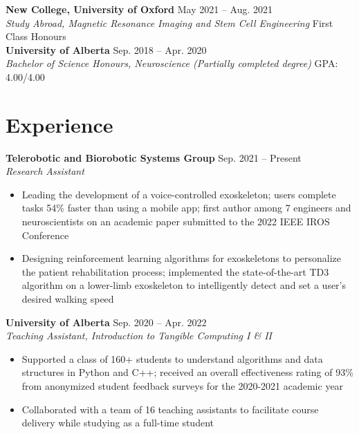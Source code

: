 \documentclass{article}
\begin{document}
\textbf{New College, University of Oxford} \hfill May 2021 -- Aug. 2021 \\
\textit{Study Abroad, Magnetic Resonance Imaging and Stem Cell Engineering} \hfill First Class Honours \\

\textbf{University of Alberta} \hfill Sep. 2018 -- Apr. 2020 \\
\textit{Bachelor of Science Honours, Neuroscience (Partially completed degree)} \hfill GPA: 4.00/4.00


\section*{\textcolor{my_colour}{Experience}}
\vspace{-.25em} \hrulefill \vspace{.25em}

\textbf{Telerobotic and Biorobotic Systems Group} \hfill Sep. 2021 -- Present\\
\textit{Research Assistant}
\begin{itemize}
    \item Leading the development of a voice-controlled exoskeleton; users complete tasks 54\% faster than using a mobile app; first author among 7 engineers and neuroscientists on an academic paper submitted to the 2022 IEEE IROS Conference
    \item Designing reinforcement learning algorithms for exoskeletons to personalize the patient rehabilitation process; implemented the state-of-the-art TD3 algorithm on a lower-limb exoskeleton to intelligently detect and set a user's desired walking speed
\end{itemize} \vspace{1em}

\textbf{University of Alberta} \hfill Sep. 2020 -- Apr. 2022 \\
\textit{Teaching Assistant, Introduction to Tangible Computing I \& II}
\begin{itemize}
    \item Supported a class of 160+ students to understand algorithms and data structures in Python and C++; received an overall effectiveness rating of 93\% from anonymized student feedback surveys for the 2020-2021 academic year
    \item Collaborated with a team of 16 teaching assistants to facilitate course delivery while studying as a full-time student
\end{itemize} \vspace{1em}
\end{document}
